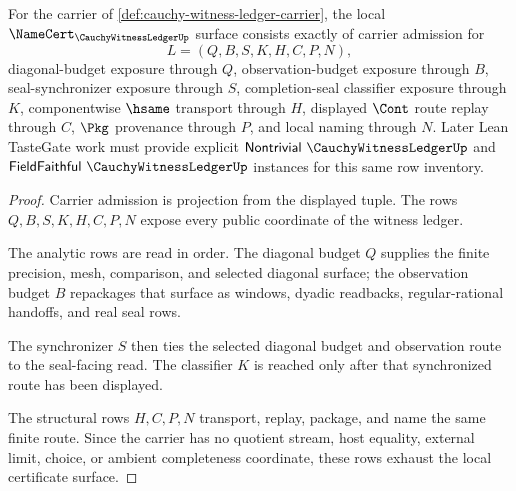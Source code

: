 \begin{theorem}
\label{thm:cauchy-witness-ledger-namecert-obligations}
For the carrier of \autoref{def:cauchy-witness-ledger-carrier}, the local $\NameCert_{\CauchyWitnessLedgerUp}$ surface consists exactly of carrier admission for
$$
L=(Q,B,S,K,H,C,P,N),
$$
diagonal-budget exposure through $Q$, observation-budget exposure through $B$, seal-synchronizer exposure through $S$, completion-seal classifier exposure through $K$, componentwise $\hsame$ transport through $H$, displayed $\Cont$ route replay through $C$, $\Pkg$ provenance through $P$, and local naming through $N$. Later Lean TasteGate work must provide explicit $\mathsf{Nontrivial}\ \CauchyWitnessLedgerUp$ and $\mathsf{FieldFaithful}\ \CauchyWitnessLedgerUp$ instances for this same row inventory.
\end{theorem}
\begin{proof}
Carrier admission is projection from the displayed tuple. The rows $Q,B,S,K,H,C,P,N$ expose every public coordinate of the witness ledger.

The analytic rows are read in order. The diagonal budget $Q$ supplies the finite precision, mesh, comparison, and selected diagonal surface; the observation budget $B$ repackages that surface as windows, dyadic readbacks, regular-rational handoffs, and real seal rows.

The synchronizer $S$ then ties the selected diagonal budget and observation route to the seal-facing read. The classifier $K$ is reached only after that synchronized route has been displayed.

The structural rows $H,C,P,N$ transport, replay, package, and name the same finite route. Since the carrier has no quotient stream, host equality, external limit, choice, or ambient completeness coordinate, these rows exhaust the local certificate surface.
\end{proof}

